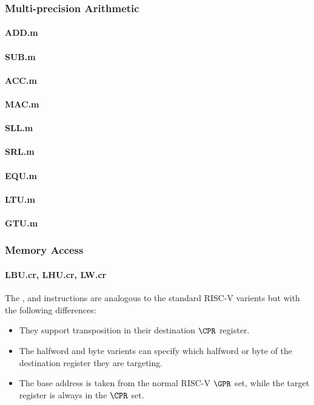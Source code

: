 \subsubsection{Multi-precision Arithmetic}
\paragraph{ADD.m}
\paragraph{SUB.m}
\paragraph{ACC.m}
\paragraph{MAC.m}
\paragraph{SLL.m}
\paragraph{SRL.m}
\paragraph{EQU.m}
\paragraph{LTU.m}
\paragraph{GTU.m}

\subsubsection{Memory Access}

\paragraph{LBU.cr, LHU.cr, LW.cr}

The ,  and  instructions are analogous to
the standard RISC-V varients but with the following differences:

\begin{itemize}
\item They support transposition in their destination $\CPR$ register.
\item The halfword and byte varients can specify which halfword or byte of
      the destination register they are targeting.
\item The base address is taken from the normal RISC-V $\GPR$ set, while the
      target register is always in the $\CPR$ set.
\end{itemize}

